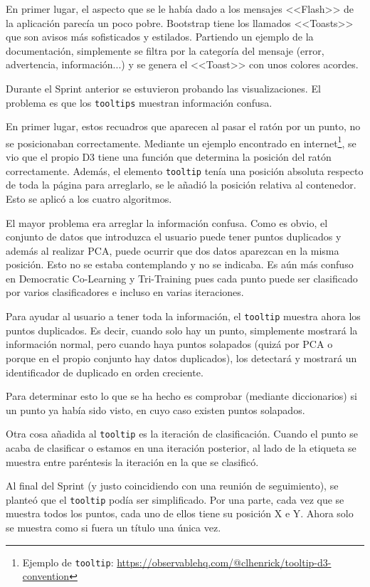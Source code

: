 En primer lugar, el aspecto que se le había dado a los mensajes <<Flash>> de la
aplicación parecía un poco pobre. Bootstrap tiene los llamados <<Toasts>> que
son avisos más sofisticados y estilados. Partiendo un ejemplo de la
documentación, simplemente se filtra por la categoría del mensaje (error,
advertencia, información...) y se genera el <<Toast>> con unos colores acordes.

Durante el Sprint anterior se estuvieron probando las visualizaciones. El
problema es que los \texttt{tooltips} muestran información confusa.

En primer lugar, estos recuadros que aparecen al pasar el ratón por un punto, no
se posicionaban correctamente. Mediante un ejemplo encontrado en
internet\footnote{Ejemplo de \texttt{tooltip}:
\url{https://observablehq.com/@clhenrick/tooltip-d3-convention}}, se vio que el
propio D3 tiene una función que determina la posición del ratón correctamente.
Además, el elemento \texttt{tooltip} tenía una posición absoluta respecto de
toda la página para arreglarlo, se le añadió la posición relativa al contenedor.
Esto se aplicó a los cuatro algoritmos.

El mayor problema era arreglar la información confusa. Como es obvio, el
conjunto de datos que introduzca el usuario puede tener puntos duplicados y
además al realizar PCA, puede ocurrir que dos datos aparezcan en la misma
posición. Esto no se estaba contemplando y no se indicaba. Es aún más confuso en
Democratic Co-Learning y Tri-Training pues cada punto puede ser clasificado por
varios clasificadores e incluso en varias iteraciones.

Para ayudar al usuario a tener toda la información, el \texttt{tooltip} muestra
ahora los puntos duplicados. Es decir, cuando solo hay un punto, simplemente
mostrará la información normal, pero cuando haya puntos solapados (quizá por
PCA o porque en el propio conjunto hay datos duplicados), los detectará y
mostrará un identificador de duplicado en orden creciente.

Para determinar esto lo que se ha hecho es comprobar (mediante diccionarios) si
un punto ya había sido visto, en cuyo caso existen puntos solapados.
 
Otra cosa añadida al \texttt{tooltip} es la iteración de clasificación. Cuando
el punto se acaba de clasificar o estamos en una iteración posterior, al lado de
la etiqueta se muestra entre paréntesis la iteración en la que se clasificó.

Al final del Sprint (y justo coincidiendo con una reunión de seguimiento), se
planteó que el \texttt{tooltip} podía ser simplificado. Por una parte, cada vez
que se muestra todos los puntos, cada uno de ellos tiene su posición X e Y.
Ahora solo se muestra como si fuera un título una única vez.

